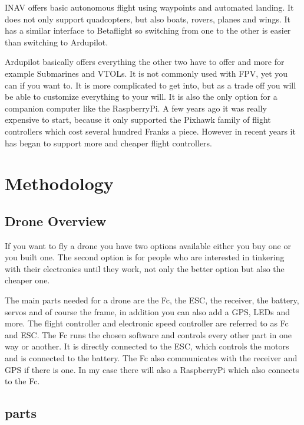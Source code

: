 \documentclass{article}
\begin{document}
	INAV offers basic autonomous flight using waypoints and automated landing. It does not only support quadcopters, but also boats, rovers, planes and wings. It has a similar interface to Betaflight so switching from one to the other is easier than switching to Ardupilot.
	
	Ardupilot basically offers everything the other two have to offer and more for example Submarines and VTOLs. It is not commonly used with FPV, yet you can if you want to. It is more complicated to get into, but as a trade off you will be able to customize everything to your will. It is also the only option for a companion computer like the RaspberryPi. A few years ago it was really expensive to start, because it only supported the Pixhawk family of flight controllers which cost several hundred Franks a piece. However in recent years it has began to support more and cheaper flight controllers.
	
	\section{Methodology}
	\subsection{Drone Overview}
	If you want to fly a drone you have two options available either you buy one or you built one. The second option is for people who are interested in tinkering with their electronics until they work, not only the better option but also the cheaper one.
	
	The main parts needed for a drone are the \gls{Fc}, the \gls{ESC}, the receiver, the battery, servos and of course the frame, in addition you can also add a \gls{GPS}, LEDs and more. The flight controller and electronic speed controller are referred to as \gls{Fc} and ESC. The \gls{Fc} runs the chosen software and controls every other part in one way or another. It is directly connected to the \gls{ESC}, which controls the motors and is connected to the battery. The \gls{Fc} also communicates with the receiver and \gls{GPS} if there is one. In my case there will also a RaspberryPi which also connects to the \gls{Fc}.
	  
	\subsection{parts}
	
\end{document}
